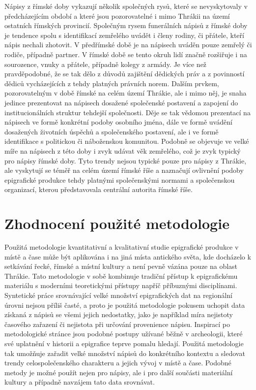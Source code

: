 Nápisy z římské doby vykazují několik společných rysů, které se nevyskytovaly v předcházejícím období a které jsou pozorovatelné i mimo Thrákii na území ostatních římských provincií. Společným rysem funerálních nápisů z římské doby je tendence spolu s identifikací zemřelého uvádět i členy rodiny, či přátele, kteří nápis nechali zhotovit. V předřímské době je na nápisech uváděn pouze zemřelý či rodiče, případně partner. V římské době se tento okruh lidí značně rozšiřuje i na sourozence, vnuky a přátele, případně kolegy z armády. Je více než pravděpodobné, že se tak dělo z důvodů zajištění dědických práv a z povinností dědiců vycházejících z tehdy platných právních norem. Dalším prvkem, pozorovatelným v době římské na celém území Thrákie, ale i mimo něj, je snaha jedince prezentovat na nápisech dosažené společenské postavení a zapojení do institucionálních struktur tehdejší společnosti. Děje se tak vědomou prezentací na nápisech ve formě konkrétní podoby osobního jména, dále ve formě uvádění dosažených životních úspěchů a společenského postavení, ale i ve formě identifikace s politickou či náboženskou komunitou. Podobně se objevuje ve velké míře na nápisech z této doby i zvyk udávat věk zemřelého, což je zvyk typický pro nápisy římské doby. Tyto trendy nejsou typické pouze pro nápisy z Thrákie, ale vyskytují se téměř na celém území římské říše a naznačují ovlivnění podoby epigrafické produkce tehdy platnými společenskými normami a společenskou organizací, kterou představovala centrální autorita římské říše.

\section[zhodnocení-použité-metodologie]{Zhodnocení použité metodologie}

Použitá metodologie kvantitativní a kvalitativní studie epigrafické produkce v místě a čase může být aplikována i na jiná místa antického světa, kde docházelo k setkávání řecké, římské a místní kultury a není pevně vázána pouze na oblast Thrákie. Tato metodologie v sobě kombinuje tradiční přístup k epigrafickému materiálu s moderními teoretickými přístupy napříč příbuznými disciplínami. Syntetické práce srovnávající velké množství epigrafických dat na regionální úrovni nejsou příliš časté, a proto je použitá metodologie pokusem uchopit data získaná z nápisů se všemi jejich nedostatky, jako je například míra nejistoty časového zařazení či nejistota při určování provenience nápisu. Inspirací po metodologické stránce jsou podobné postupy užívané běžně v archeologii, které své uplatnění v historii a epigrafice teprve pomalu hledají. Použitá metodologie tak umožňuje zařadit velké množství nápisů do konkrétního kontextu a sledovat trendy celospolečenského charakteru a jejich vývoj v místě a čase. Podobné metody je možné použít nejen pro nápisy, ale i pro další součásti materiální kultury a případně navzájem tato data srovnávat.

